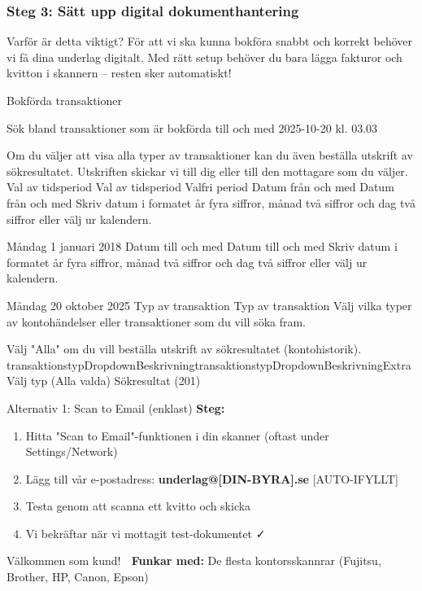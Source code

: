\documentclass[10pt]{beamer}
\begin{document}
\begin{frame}[fragile]
  \frametitle{Steg 3: Sätt upp digital dokumenthantering}

  \begin{block}{Varför är detta viktigt?}
    \vspace{0.2cm}
    För att vi ska kunna bokföra snabbt och korrekt behöver vi få dina underlag digitalt.
    Med rätt setup behöver du bara lägga fakturor och kvitton i skannern – resten sker automatiskt!
  \end{block}

  \vspace{0.4cm}Bokförda transaktioner

Sök bland transaktioner som är bokförda till och med 2025-10-20 kl. 03.03

Om du väljer att visa alla typer av transaktioner kan du även beställa utskrift av sökresultatet. Utskriften skickar vi till dig eller till den mottagare som du väljer.
Val av tidsperiod Val av tidsperiod
Valfri period
Datum från och med Datum från och med
Skriv datum i formatet år fyra siffror, månad två siffror och dag två siffror eller välj ur kalendern.

Måndag 1 januari 2018
Datum till och med Datum till och med
Skriv datum i formatet år fyra siffror, månad två siffror och dag två siffror eller välj ur kalendern.

Måndag 20 oktober 2025
Typ av transaktion Typ av transaktion
Välj vilka typer av kontohändelser eller transaktioner som du vill söka fram.

Välj "Alla" om du vill beställa utskrift av sökresultatet (kontohistorik).
transaktionstypDropdownBeskrivningtransaktionstypDropdownBeskrivningExtra
Välj typ (Alla valda)
Sökresultat (201)


  \begin{block}{Alternativ 1: Scan to Email (enklast)}
    \footnotesize
    \textbf{Steg:}
    \begin{enumerate}
      \item Hitta "Scan to Email"-funktionen i din skanner (oftast under Settings/Network)
      \item Lägg till vår e-postadress: \textbf{underlag@[DIN-BYRA].se} [AUTO-IFYLLT]
      \item Testa genom att scanna ett kvitto och skicka
      \item Vi bekräftar när vi mottagit test-dokumentet ✓
    \end{enumerate}Välkommen som kund! 🎉
    \textbf{Funkar med:} De flesta kontorsskannrar (Fujitsu, Brother, HP, Canon, Epson)
  \end{block}


\end{frame}
\end{document}

